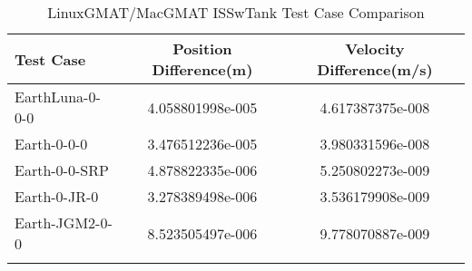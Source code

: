 \begin{table}[htbp!]
\centering
\caption{ LinuxGMAT/MacGMAT ISSwTank Test Case Comparison}
      \begin{tabular}{lcc}
      \hline\hline
          Test Case & Position Difference(m) & Velocity Difference(m/s) \\
         \hline
         EarthLuna-0-0-0 & 4.058801998e-005 & 4.617387375e-008 \\
         Earth-0-0-0 & 3.476512236e-005 & 3.980331596e-008 \\
         Earth-0-0-SRP & 4.878822335e-006 & 5.250802273e-009 \\
         Earth-0-JR-0 & 3.278389498e-006 & 3.536179908e-009 \\
         Earth-JGM2-0-0 & 8.523505497e-006 & 9.778070887e-009 \\
      \hline\hline
      \label{Table: ISSwTank LinuxGMAT-MacGMAT Table} 
\end{tabular}
\end{table}
